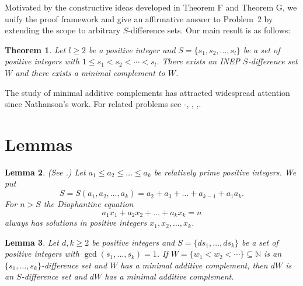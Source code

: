 \documentclass[12pt]{article}
\numberwithin{equation}{section}
\newtheorem{theorem}{Theorem}[section] %
\newtheorem{lemma}[theorem]{Lemma} %
\begin{document}
Motivated by the constructive ideas developed in Theorem F and Theorem G, we unify the proof framework and give an affirmative answer to Problem~2 by extending the scope to arbitrary $S$-difference sets. Our main result is as follows:

  \begin{theorem}\label{thm1} Let $l\geqslant 2$ be a positive integer and $S=\{s_1, s_2, \dots, s_l\}$ be a set of positive integers with $1\leqslant s_1<s_2<\cdots<s_l$. There exists an {\it INEP $S$-difference set} $W$ and there exists a minimal complement to $W$.
\end{theorem}

The study of minimal additive complements has attracted widespread attention since Nathanson's work. For related problems see \cite{AL2021}-\cite{BS2021AAM}, \cite{BL2023}, \cite{K2019},\cite{Z2023}.

 \section{Lemmas}

 \begin{lemma}\label{lem1} (See \cite[Theorem 1]{Brauer42}.) Let $a_1 \leqslant a_2 \leqslant \dots \leqslant a_k$ be relatively prime positive integers. We put
$$S = S(a_1, a_2, \dots, a_k) = a_2 + a_3 + \dots + a_{k-1} + a_1 a_k.$$
For $n > S$ the Diophantine equation
$$a_1 x_1 + a_2 x_2 + \dots + a_k x_k = n$$
always has solutions in positive integers $x_1, x_2, \dots, x_k$.
\end{lemma}

 \begin{lemma}\label{lem2} Let $d,k\geqslant 2$ be positive integers and $S=\{ds_1,\ldots,ds_k\}$ be a set of positive integers with $\gcd(s_1,\ldots,s_k)=1$.
 If $W = \{ w_1 < w_2 < \cdots \} \subseteq \mathbb{N}$ is an $\{s_1,\ldots,s_k\}$-difference set and $W$ has a minimal additive complement, then $dW$ is an $S$-difference set and $dW$ has a minimal additive complement.
  \end{lemma}
\end{document}
